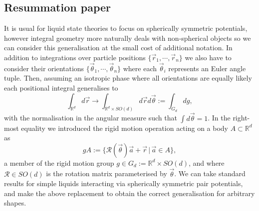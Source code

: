 \subsection{Resummation paper}

It is usual for liquid state theories to focus on spherically symmetric potentials, however integral geometry more naturally deals with non-spherical objects so we can consider this generalisation at the small cost of additional notation.
In addition to integrations over particle positions $\{\vec{r}_1, \cdots, \vec{r}_n\}$ we also have to consider their orientations $\{\vec{\theta}_1, \cdots, \vec{\theta}_n\}$ where each $\vec{\theta}_i$ represents an Euler angle tuple.
Then, assuming an isotropic phase where all orientations are equally likely each positional integral generalises to
\begin{equation*}
  \int_{\mathbb{R}^d} d\vec{r}
  \to
  \int_{\mathbb{R}^d \times SO(d)} d\vec{r} d\vec{\theta}
  :=
  \int_{G_d} dg,
\end{equation*}
with the normalisation in the angular measure such that $\int d\vec{\theta} = 1$. In the right-most equality we introduced the rigid motion operation acting on a body $A \subset \mathbb{R}^d$ as
\begin{equation*}
  g A := \{\mathcal{R}(\vec{\theta}) \vec{a} + \vec{r} \, | \, \vec{a} \in A\},
\end{equation*}
a member of the rigid motion group $g \in G_d := \mathbb{R}^d \times SO(d)$, and where $\mathcal{R} \in SO(d)$ is the rotation matrix parameterised by $\vec{\theta}$.
We can take standard results for simple liquids interacting via spherically symmetric pair potentials, and make the above replacement to obtain the correct generalisation for arbitrary shapes.

